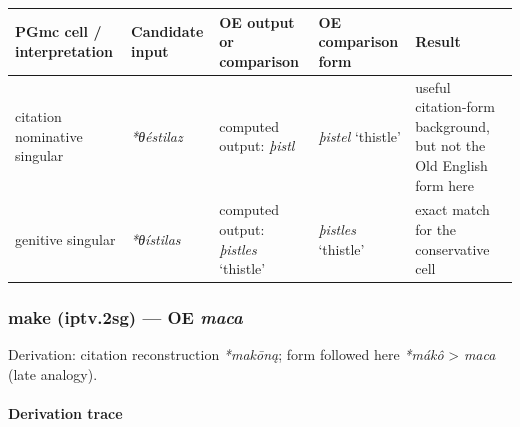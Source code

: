 \documentclass[
  british,
  a4paper,
]{article}
\newcounter{none} %
\begin{document}
{\def\LTcaptype{none} %
\begin{longtable}[]{@{}
  >{\raggedright\arraybackslash}p{}
  >{\raggedright\arraybackslash}p{}
  >{\raggedright\arraybackslash}p{}
  >{\raggedright\arraybackslash}p{}
  >{\raggedright\arraybackslash}p{}@{}}
\toprule\noalign{}
\begin{minipage}[b]{\linewidth}\raggedright
PGmc cell / interpretation
\end{minipage} & \begin{minipage}[b]{\linewidth}\raggedright
Candidate input
\end{minipage} & \begin{minipage}[b]{\linewidth}\raggedright
OE output or comparison
\end{minipage} & \begin{minipage}[b]{\linewidth}\raggedright
OE comparison form
\end{minipage} & \begin{minipage}[b]{\linewidth}\raggedright
Result
\end{minipage} \\
\midrule\noalign{}
\endhead
\bottomrule\noalign{}
\endlastfoot
citation nominative singular & {\emph{*θéstilaz}} & computed output:
{\emph{þistl}} & {\emph{þistel}} `thistle' & useful citation-form
background, but not the Old English form here \\
genitive singular & {\emph{*θístilas}} & computed output:
{\emph{þistles}} `thistle' & {\emph{þistles}} `thistle' & exact match
for the conservative cell \\
\end{longtable}
}

\subsubsection{\texorpdfstring{make (iptv.2sg) --- OE
\emph{maca}}{make (iptv.2sg) --- OE maca}}\label{make-iptv.2sg-oe-maca}

Derivation: citation reconstruction \emph{*makōną}; form followed here
\emph{*mákô} \textgreater{} \emph{maca} (late analogy).

\paragraph{Derivation trace}\label{derivation-trace-140}
\end{document}
